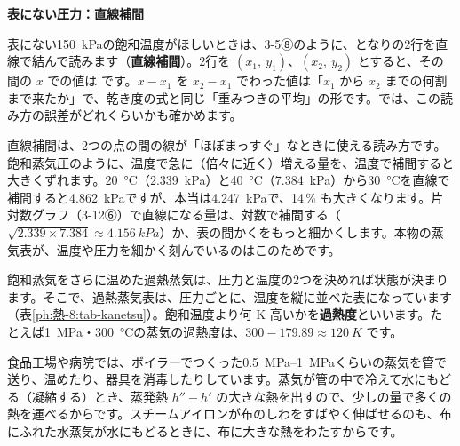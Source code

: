 \noindent\textbf{表にない圧力：直線補間}\par\nobreak
表にない\qty{150}{kPa}の飽和温度がほしいときは、3-5⑧のように、となりの2行を直線で結んで読みます（\textbf{直線補間}）。2行を $(x_1,\ y_1)$、$(x_2,\ y_2)$ とすると、その間の $x$ での値は
です。$x-x_1$ を $x_2-x_1$ でわった値は「$x_1$ から $x_2$ までの何割まで来たか」で、乾き度の式と同じ「重みつきの平均」の形です。では、この読み方の誤差がどれくらいかも確かめます。
\begin{bkcenter}
\end{bkcenter}

\begin{seikaku}
直線補間は、2つの点の間の線が「ほぼまっすぐ」なときに使える読み方です。飽和蒸気圧のように、温度で急に（倍々に近く）増える量を、温度で補間すると大きくずれます。\qty{20}{\celsius}（\qty{2.339}{kPa}）と\qty{40}{\celsius}（\qty{7.384}{kPa}）から\qty{30}{\celsius}を直線で補間すると\qty{4.862}{kPa}ですが、本当は\qty{4.247}{kPa}で、14\,\% も大きくなります。片対数グラフ（3-12⑥）で直線になる量は、対数で補間する（$\sqrt{2.339\times7.384}\approx\qty{4.156}{kPa}$）か、表の間かくをもっと細かくします。本物の蒸気表が、温度や圧力を細かく刻んでいるのはこのためです。
\end{seikaku}


\leavevmode\label{ph:熱-8:sec4}飽和蒸気をさらに温めた過熱蒸気は、圧力と温度の2つを決めれば状態が決まります。そこで、過熱蒸気表は、圧力ごとに、温度を縦に並べた表になっています（表\ref{ph:熱-8:tab-kanetsu}）。飽和温度より何 K 高いかを\textbf{過熱度}といいます。たとえば\qty{1}{MPa}・\qty{300}{\celsius}の蒸気の過熱度は、$300-179.89\approx\qty{120}{K}$ です。
\begin{phmijika}
食品工場や病院では、ボイラーでつくった\qtyrange{0.5}{1}{MPa}くらいの蒸気を管で送り、温めたり、器具を消毒したりしています。蒸気が管の中で冷えて水にもどる（凝縮する）とき、蒸発熱 $h''-h'$ の大きな熱を出すので、少しの量で多くの熱を運べるからです。スチームアイロンが布のしわをすばやく伸ばせるのも、布にふれた水蒸気が水にもどるときに、布に大きな熱をわたすからです。
\end{phmijika}

